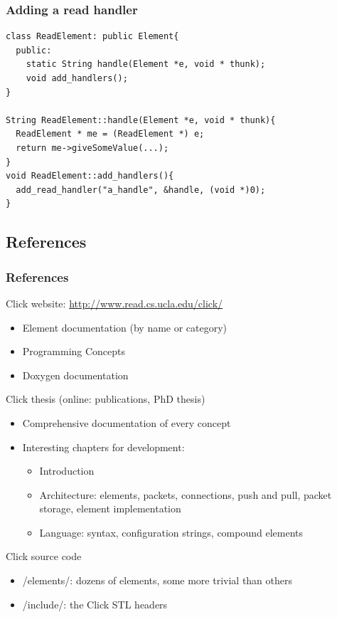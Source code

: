 \documentclass{beamer}
\begin{document}
\begin{frame}[fragile]
\frametitle{Adding a read handler}
\begin{lstlisting}
class ReadElement: public Element{
  public:
    static String handle(Element *e, void * thunk);
    void add_handlers();
}

String ReadElement::handle(Element *e, void * thunk){
  ReadElement * me = (ReadElement *) e;
  return me->giveSomeValue(...);
}
void ReadElement::add_handlers(){
  add_read_handler("a_handle", &handle, (void *)0);
}
\end{lstlisting}
\end{frame}

\subsection{References} %
\label{sub:references}
\begin{frame}
\frametitle{References}
Click website: \url{http://www.read.cs.ucla.edu/click/}
\begin{itemize}
	\item Element documentation (by name or category)
	\item Programming Concepts
	\item Doxygen documentation
\end{itemize}
Click thesis (online: publications, PhD thesis)
\begin{itemize}
	\item Comprehensive documentation of every concept
	\item Interesting chapters for development:
	\begin{itemize}
		\item Introduction
		\item Architecture: elements, packets, connections, push and pull, packet storage, element implementation
		\item Language: syntax, configuration strings, compound elements
	\end{itemize}
\end{itemize}
Click source code
\begin{itemize}
	\item /elements/: dozens of elements, some more trivial than others
	\item /include/: the Click STL headers
\end{itemize}
\end{frame}
\end{document}
